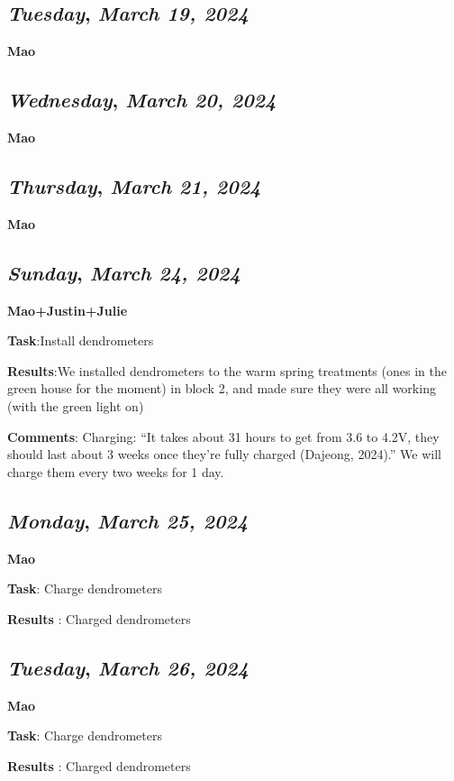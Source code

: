 \def\day{\textit{March 19, 2024}}
\def\weekday{\textit{Tuesday}}
\subsection*{\weekday, \day}
\textbf {Mao}

\def\day{\textit{March 20, 2024}}
\def\weekday{\textit{Wednesday}}
\subsection*{\weekday, \day}
\textbf {Mao}

\def\day{\textit{March 21, 2024}}
\def\weekday{\textit{Thursday}}
\subsection*{\weekday, \day}
\textbf {Mao}

\def\day{\textit{March 24, 2024}}
\def\weekday{\textit{Sunday}}
\subsection*{\weekday, \day}
\textbf {Mao+Justin+Julie}
\par 
\textbf {Task}:Install dendrometers
\par 
\textbf {Results}:We installed dendrometers to the warm spring treatments (ones in the green house for the moment) in block 2, and made sure they were all working (with the green light on)
\par 
\textbf {Comments}: Charging: “It takes about 31 hours to get from 3.6 to 4.2V, they should last about 3 weeks once they're fully charged (Dajeong, 2024).”
We will charge them every two weeks for 1 day.

\def\day{\textit{March 25, 2024}}
\def\weekday{\textit{Monday}}
\subsection*{\weekday, \day}
\textbf {Mao}
\par 
\textbf {Task}: Charge dendrometers
\par
\textbf {Results} : Charged dendrometers

\def\day{\textit{March 26, 2024}}
\def\weekday{\textit{Tuesday}}
\subsection*{\weekday, \day}
\textbf {Mao}
\par 
\textbf {Task}: Charge dendrometers
\par
\textbf {Results} : Charged dendrometers


